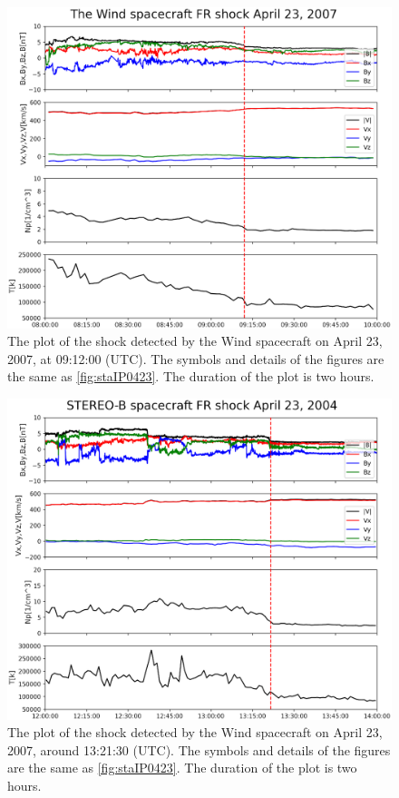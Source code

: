 \documentclass[draft]{agujournal2019}
\begin{document}
\pagebreak

\begin{figure}[!t]
\centering
\includegraphics[width=1.\textwidth]{jgr-2023-ipshocks-f20.eps}
\caption{The plot of the shock detected by the Wind spacecraft on April 23, 2007, at 09:12:00 (UTC). The symbols and details of the figures are the same as \ref{fig:staIP0423}. The duration of the plot is two hours.}
\label{fig:WindIP0423}
\end{figure}

\pagebreak

\begin{figure}[!t]
\centering
\includegraphics[width=1.\textwidth]{jgr-2023-ipshocks-f21.eps}
\caption{The plot of the shock detected by the Wind spacecraft on April 23, 2007, around 13:21:30 (UTC). The symbols and details of the figures are the same as \ref{fig:staIP0423}. The duration of the plot is two hours.}
\label{fig:stbIP0423}
\end{figure}
\end{document}
